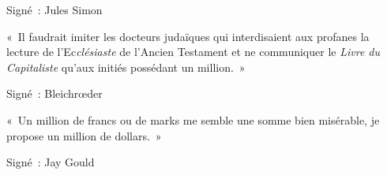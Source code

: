 \documentclass[french,twoside]{book} %
\begin{document}
\begin{center}
\noindent Signé : Jules Simon\par
\end{center}

\noindent « Il faudrait imiter les docteurs judaïques qui interdisaient aux profanes la lecture de l’Ec\emph{clésiaste} de l’Ancien Testament et ne communiquer le \emph{Livre du Capitaliste} qu’aux initiés possédant un million. »\par

\begin{center}
\noindent Signé : Bleichrœder\par
\end{center}

\noindent « Un million de francs ou de marks me semble une somme bien misérable, je propose un million de dollars. »\par

\begin{center}
\noindent Signé : Jay Gould\par
\end{center}
\end{document}
